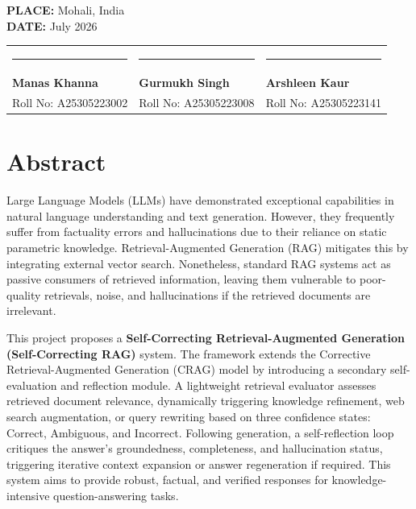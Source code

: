 \documentclass[12pt,a4paper]{article}
\begin{document}
\vspace{3cm}

\noindent
\textbf{PLACE:} Mohali, India \\
\textbf{DATE:} July 2026

\vspace{1.5cm}

\noindent
\begin{tabularx}{\textwidth}{XXX}
    \rule{3.5cm}{0.4pt} & \rule{3.5cm}{0.4pt} & \rule{3.5cm}{0.4pt} \\
    \textbf{Manas Khanna} & \textbf{Gurmukh Singh} & \textbf{Arshleen Kaur} \\
    Roll No: A25305223002 & Roll No: A25305223008 & Roll No: A25305223141
\end{tabularx}

\newpage

\renewcommand{\contentsname}{CONTENT}
\tableofcontents

\newpage
{}

\section*{Abstract}
Large Language Models (LLMs) have demonstrated exceptional capabilities in natural language understanding and text generation. However, they frequently suffer from factuality errors and hallucinations due to their reliance on static parametric knowledge. Retrieval-Augmented Generation (RAG) mitigates this by integrating external vector search. Nonetheless, standard RAG systems act as passive consumers of retrieved information, leaving them vulnerable to poor-quality retrievals, noise, and hallucinations if the retrieved documents are irrelevant. 

This project proposes a \textbf{Self-Correcting Retrieval-Augmented Generation (Self-Correcting RAG)} system. The framework extends the Corrective Retrieval-Augmented Generation (CRAG) model by introducing a secondary self-evaluation and reflection module. A lightweight retrieval evaluator assesses retrieved document relevance, dynamically triggering knowledge refinement, web search augmentation, or query rewriting based on three confidence states: Correct, Ambiguous, and Incorrect. Following generation, a self-reflection loop critiques the answer's groundedness, completeness, and hallucination status, triggering iterative context expansion or answer regeneration if required. This system aims to provide robust, factual, and verified responses for knowledge-intensive question-answering tasks.
\end{document}
